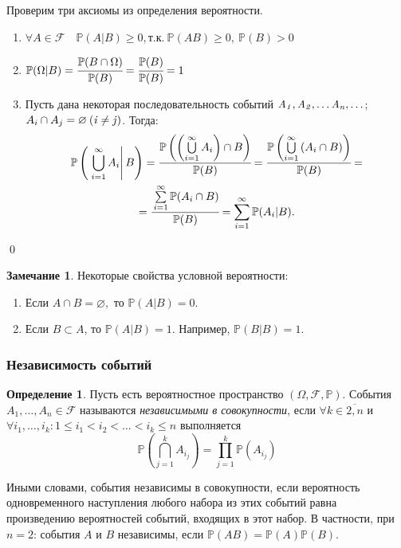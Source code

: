 \documentclass[oneside,final,14pt]{extreport}
\newcommand\myprob[1]{{\mathbb{P}(#1)}}
\renewenvironment{proof}{{\bfseries Доказательство.}}{\qed}
\theoremstyle{plain}
\theoremstyle{definition}
\newtheorem*{defn}{Определение}
\newtheorem*{rmrk}{Замечание}
\theoremstyle{named}
\begin{document}
\begin{proof}
    Проверим три аксиомы из определения вероятности.

\begin{enumerate}
    \item $\forall A \in \mathcal{F} \quad \myprob{A|B} \geqslant 0, \text{т.к.}~ \myprob{AB} \geqslant 0,~ \myprob{B} > 0$
    \item  $\myprob{\Omega|B} = \cfrac{\myprob{B \cap \Omega}}{\myprob{B}} = \cfrac{\myprob{B}}{\myprob{B}} = 1$
    \item Пусть дана некоторая последовательность событий $\it A_1, A_2, \ldots A_n, \ldots$; $A_i \cap A_j = \varnothing \: ({\it i \ne j})$. Тогда: 
    \begin{multline*}
        \mathbb{P}\left(\,\left. \bigcup\limits_{i=1}^\infty A_i \right| B\right)  = \cfrac{\mathbb{P}\left(\left(\bigcup\limits_{i=1}^\infty A_i\right) \cap B\right)}{\myprob{B}} = \cfrac{\mathbb{P}\left(\bigcup\limits_{i=1}^\infty\left(A_i \cap B\right)\right)}{\myprob{B}} = \\
        = \cfrac{\sum\limits_{i=1}^\infty \myprob{A_i \cap B}}{\myprob{B}}
        = \sum\limits_{i=1}^\infty \myprob{A_i | B}.
    \end{multline*}
\end{enumerate}
\end{proof}
\begin{rmrk}
    Некоторые свойства условной вероятности:
    \begin{enumerate}
        \item Если $A \cap B = \varnothing,$ то $\myprob {A | B} = 0.$ 
        \item Если $B \subset A$, то $\myprob{A|B} = 1.$ Например, $\myprob{B|B} = 1.$
    \end{enumerate}
\end{rmrk}

\subsubsection{Независимость событий}

\begin{defn}
    Пусть есть вероятностное пространство $(\Omega, \mathcal{F}, \mathbb{P})$. События $A_1, \ldots, A_n \in \mathcal{F}$ называются {\it независимыми в совокупности}, если $\forall k \in \overline{2, n}$ и $\forall i_{1}, \ldots, i_{k} \colon 1 \leqslant i_1 < i_2 < \ldots < i_k \leqslant n$ выполняется 
    \begin{equation*}
        \mathbb{P}\left(\bigcap\limits_{j=1}^k A_{i_j}\right) = \prod\limits_{j=1}^k \myprob{A_{i_j}}
    \end{equation*}

Иными словами, события независимы в совокупности, если вероятность одновременного наступления любого набора из этих событий равна произведению вероятностей событий, входящих в этот набор. В частности, при $n = 2$: события $A$ и $B$ независимы, если $\myprob{AB} = \myprob{A}\myprob{B}$.
\end{defn}
\end{document}
